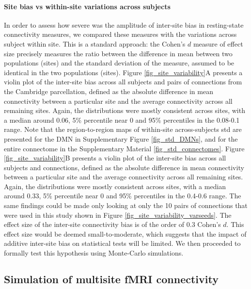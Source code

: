 \documentclass[authoryear]{elsarticle}
\begin{document}
\paragraph{Site bias vs within-site variations across subjects} In order to assess how severe was the amplitude of inter-site bias in resting-state connectivity measures, we compared these measures with the variations across subject within site. This is a standard approach: the Cohen's $d$ measure of effect size \citep{Cohen1992} precisely measures the ratio between the difference in mean between two populations (sites) and the standard deviation of the measure, assumed to be identical in the two populations (sites). Figure \ref{fig_site_variability}A presents a violin plot of the inter-site bias across all subjects and pairs of connections from the Cambridge parcellation, defined as the absolute difference in mean connectivity between a particular site and the average connectivity across all remaining sites. Again, the distributions were mostly consistent across sites, with a median around 0.06, 5\% percentile near 0 and 95\% percentiles in the 0.08-0.1 range. Note that the region-to-region maps of within-site across-subjects std are presented for the DMN in Supplementary Figure \ref{fig_std_DMNs}, and for the entire connectome in the Supplementary Material \ref{fig_std_connectomes}. Figure \ref{fig_site_variability}B presents a violin plot of the inter-site bias across all subjects and connections, defined as the absolute difference in mean connectivity between a particular site and the average connectivity across all remaining sites. Again, the distributions were mostly consistent across sites, with a median around 0.33, 5\% percentile near 0 and 95\% percentiles in the 0.4-0.6 range. The same findings could be made only looking at only the 10 pairs of connections that were used in this study shown in Figure \ref{fig_site_variability_varseeds}. The effect size of the inter-site connectivity bias is of the order of 0.3 Cohen's $d$. This effect size would be deemed small-to-moderate, which suggests that the impact of additive inter-site bias on statistical tests will be limited. We then proceeded to formally test this hypothesis using Monte-Carlo simulations. 

\subsection{Simulation of multisite fMRI connectivity}
\end{document}
